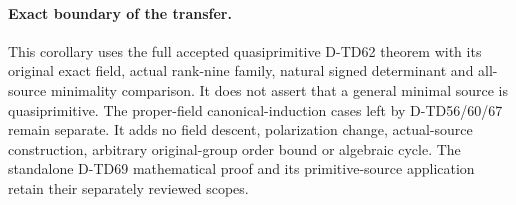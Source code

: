 \paragraph{Exact boundary of the transfer.}
This corollary uses the full accepted quasiprimitive D-TD62 theorem
with its original exact field, actual rank-nine family, natural
signed determinant and all-source minimality comparison.
It does not assert that a general minimal source is quasiprimitive.
The proper-field canonical-induction cases left by D-TD56/60/67
remain separate. It adds no field descent, polarization change,
actual-source construction, arbitrary original-group order bound
or algebraic cycle. The standalone D-TD69 mathematical proof and its
primitive-source application retain their separately reviewed scopes.
